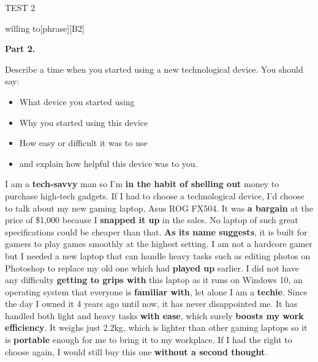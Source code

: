 \begin{glossarymc}[Cambridge 13]
\begin{test}{TEST 2}
\begin{VocabExplain}[Part 1]
            \begin{ExplainCard}{willing to}[phrase][B2]
            \end{ExplainCard}
        \end{VocabExplain}

    \noindent
    \textbf{Part 2.}
    \begin{qa}{Describe a time when you started using a new technological device. You should say: 
    \begin{itemize}
        \item What device you started using
        \item Why you started using this device
        \item How easy or difficult it was to use
        \item and explain how helpful this device was to you.
    \end{itemize}}

    I am a \textbf{tech-savvy} man so I’m \textbf{in the habit of shelling out} money to purchase high-tech gadgets. If I had to choose a technological device, I’d choose to talk about my new gaming laptop, Asus ROG FX504. It was \textbf{a bargain} at the price of \$1,000 because I \textbf{snapped it up} in the sales. No laptop of such great specifications could be cheaper than that. \textbf{As its name suggests}, it is built for gamers to play games smoothly at the highest setting. I am not a hardcore gamer but I needed a new laptop that can handle heavy tasks such as editing photos on Photoshop to replace my old one which had \textbf{played up} earlier. I did not have any difficulty \textbf{getting to grips with} this laptop as it runs on Windows 10, an operating system that everyone is \textbf{familiar with}, let alone I am a \textbf{techie}. Since the day I owned it 4 years ago until now, it has never disappointed me. It has handled both light and heavy tasks \textbf{with ease}, which surely \textbf{boosts my work efficiency}. It weighs just 2.2kg, which is lighter than other gaming laptops so it is \textbf{portable} enough for me to bring it to my workplace. If I had the right to choose again, I would still buy this one \textbf{without a second thought}.
    \end{qa}


\end{test}
\end{glossarymc}
